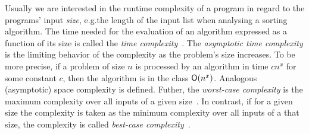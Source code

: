 \documentclass[envcountsame]{llncs}
\begin{document}
Usually we are interested in the runtime complexity of a program in regard to the programs' input
\textit{size}, e.g.\@ the length of the input list when analysing a sorting algorithm.
%
The time needed for the evaluation of an algorithm expressed as a function of its size is called the
\textit{time complexity}~\cite{Aho:1974:DAC:578775}. The \textit{asymptotic time complexity} is the
limiting behavior of the complexity as the problem's size increases. To be more precise, if a
problem of size \(n\) is processed by an algorithm in time \(c n^{x}\) for some constant \(c\), then
the algorithm is in the class \(\mathsf{O}(n^{x})\). Analogous (asymptotic) space complexity is defined.
Futher, the \textit{worst-case complexity} is the maximum complexity over all inputs of a given
size~\cite{Aho:1974:DAC:578775}. In contrast, if for a given size the complexity is taken as the
minimum complexity over all inputs of a that size, the complexity is called \textit{best-case
  complexity}~\cite{Wegbreit75}.






\end{document}
